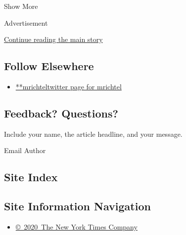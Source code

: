 Show More

Advertisement

\protect\hyperlink{after-mid2}{Continue reading the main story}

\hypertarget{follow-elsewhere}{%
\subsection{Follow Elsewhere}\label{follow-elsewhere}}

\begin{itemize}
\tightlist
\item
  \href{https://twitter.com/mrichtel}{**mrichteltwitter page for
  mrichtel}
\end{itemize}

\hypertarget{feedback-questions}{%
\subsection{Feedback? Questions?}\label{feedback-questions}}

Include your name, the article headline, and your message.

Email Author

\hypertarget{site-index}{%
\subsection{Site Index}\label{site-index}}

\hypertarget{site-information-navigation}{%
\subsection{Site Information
Navigation}\label{site-information-navigation}}

\begin{itemize}
\tightlist
\item
  \href{https://help.nytimes.com/hc/en-us/articles/115014792127-Copyright-notice}{©~2020~The
  New York Times Company}
\end{itemize}


